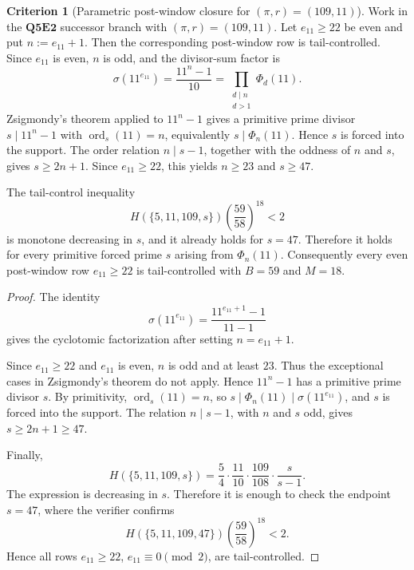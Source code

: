 \documentclass[11pt]{article}
\theoremstyle{definition}
\newtheorem{criterion}[theorem]{Criterion}
\theoremstyle{remark}
\begin{document}
\begin{criterion}[Parametric post-window closure for \texorpdfstring{\((\pi,r)=(109,11)\)}{(pi,r)=(109,11)}]
\label{crit:q5e2-pi109-r11-parametric-post-window}
Work in the \(\mathbf{Q5E2}\) successor branch with \((\pi,r)=(109,11)\).
Let \(e_{11}\ge22\) be even and put \(n:=e_{11}+1\).  Then the corresponding
post-window row is tail-controlled.  Since \(e_{11}\) is even, \(n\) is odd,
and the divisor-sum factor is
\[
  \sigma(11^{e_{11}})
  =
  \frac{11^n-1}{10}
  =
  \prod_{\substack{d\mid n\\ d>1}}\Phi_d(11).
\]
Zsigmondy's theorem applied to \(11^n-1\) gives a primitive prime divisor
\(s\mid11^n-1\) with \(\operatorname{ord}_s(11)=n\), equivalently
\(s\mid\Phi_n(11)\).  Hence \(s\) is forced into the support.  The order
relation \(n\mid s-1\), together with the oddness of \(n\) and \(s\), gives
\(s\ge2n+1\).  Since \(e_{11}\ge22\), this yields \(n\ge23\) and \(s\ge47\).

The tail-control inequality
\[
  H(\{5,11,109,s\})
  \left(\frac{59}{58}\right)^{18}<2
\]
is monotone decreasing in \(s\), and it already holds for \(s=47\).  Therefore
it holds for every primitive forced prime \(s\) arising from \(\Phi_n(11)\).
Consequently every even post-window row \(e_{11}\ge22\) is tail-controlled with
\(B=59\) and \(M=18\).
\end{criterion}

\begin{proof}
The identity
\[
  \sigma(11^{e_{11}})
  =
  \frac{11^{e_{11}+1}-1}{11-1}
\]
gives the cyclotomic factorization after setting \(n=e_{11}+1\).

Since \(e_{11}\ge22\) and \(e_{11}\) is even, \(n\) is odd and at least \(23\).
Thus the exceptional cases in Zsigmondy's theorem do not apply.  Hence
\(11^n-1\) has a primitive prime divisor \(s\).  By primitivity,
\(\operatorname{ord}_s(11)=n\), so
\(s\mid\Phi_n(11)\mid\sigma(11^{e_{11}})\), and \(s\) is forced into the
support.  The relation \(n\mid s-1\), with \(n\) and \(s\) odd, gives
\(s\ge2n+1\ge47\).

Finally,
\[
  H(\{5,11,109,s\})
  =
  \frac54\cdot\frac{11}{10}\cdot\frac{109}{108}\cdot\frac{s}{s-1}.
\]
The expression is decreasing in \(s\).  Therefore it is enough to check the
endpoint \(s=47\), where the verifier confirms
\[
  H(\{5,11,109,47\})
  \left(\frac{59}{58}\right)^{18}<2.
\]
Hence all rows \(e_{11}\ge22\), \(e_{11}\equiv0\pmod2\), are tail-controlled.
\end{proof}
\end{document}
